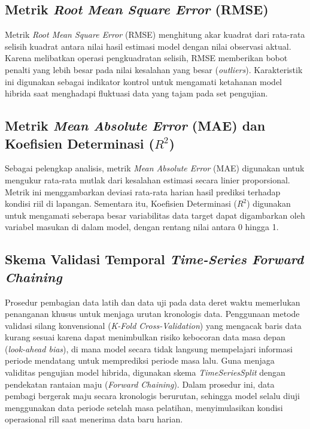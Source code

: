 \subsection{Metrik \textit{Root Mean Square Error} (RMSE)}

Metrik \textit{Root Mean Square Error} (RMSE) menghitung akar kuadrat dari rata-rata selisih kuadrat antara nilai hasil estimasi model dengan nilai observasi aktual. Karena melibatkan operasi pengkuadratan selisih, RMSE memberikan bobot penalti yang lebih besar pada nilai kesalahan yang besar (\textit{outliers}). Karakteristik ini digunakan sebagai indikator kontrol untuk mengamati ketahanan model hibrida saat menghadapi fluktuasi data yang tajam pada set pengujian.

\subsection{Metrik \textit{Mean Absolute Error} (MAE) dan Koefisien Determinasi ($R^2$)}

Sebagai pelengkap analisis, metrik \textit{Mean Absolute Error} (MAE) digunakan untuk mengukur rata-rata mutlak dari kesalahan estimasi secara linier proporsional. Metrik ini menggambarkan deviasi rata-rata harian hasil prediksi terhadap kondisi riil di lapangan. Sementara itu, Koefisien Determinasi ($R^2$) digunakan untuk mengamati seberapa besar variabilitas data target dapat digambarkan oleh variabel masukan di dalam model, dengan rentang nilai antara 0 hingga 1.

\subsection{Skema Validasi Temporal \textit{Time-Series Forward Chaining}}

Prosedur pembagian data latih dan data uji pada data deret waktu memerlukan penanganan khusus untuk menjaga urutan kronologis data. Penggunaan metode validasi silang konvensional (\textit{K-Fold Cross-Validation}) yang mengacak baris data kurang sesuai karena dapat menimbulkan risiko kebocoran data masa depan (\textit{look-ahead bias}), di mana model secara tidak langsung mempelajari informasi periode mendatang untuk memprediksi periode masa lalu. Guna menjaga validitas pengujian model hibrida, digunakan skema \textit{TimeSeriesSplit} dengan pendekatan rantaian maju (\textit{Forward Chaining}). Dalam prosedur ini, data pembagi bergerak maju secara kronologis berurutan, sehingga model selalu diuji menggunakan data periode setelah masa pelatihan, menyimulasikan kondisi operasional rill saat menerima data baru harian.